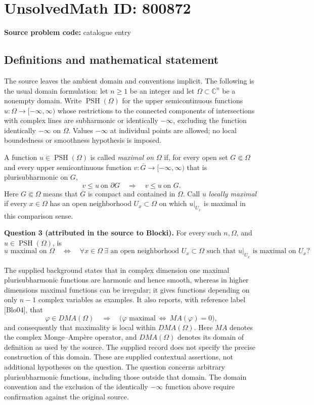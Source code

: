 \documentclass[11pt]{article}
\newcommand{\C}{\mathbb{C}}
\begin{document}
\section*{UnsolvedMath ID: 800872}
\textbf{Source problem code:} catalogue entry
\subsection{Definitions and mathematical statement}
The source leaves the ambient domain and conventions implicit. The following is the usual domain formulation: let \(n\geq 1\) be an integer and let \(\Omega\subset\C^n\) be a nonempty domain. Write \(\operatorname{PSH}(\Omega)\) for the upper semicontinuous functions \(u:\Omega\to[-\infty,\infty)\) whose restrictions to the connected components of intersections with complex lines are subharmonic or identically \(-\infty\), excluding the function identically \(-\infty\) on \(\Omega\). Values \(-\infty\) at individual points are allowed; no local boundedness or smoothness hypothesis is imposed.

A function \(u\in\operatorname{PSH}(\Omega)\) is called \emph{maximal on \(\Omega\)} if, for every open set \(G\Subset\Omega\) and every upper semicontinuous function \(v:\overline G\to[-\infty,\infty)\) that is plurisubharmonic on \(G\),
\[
 v\leq u\ \text{on }\partial G
 \quad\Longrightarrow\quad
 v\leq u\ \text{on }G.
\]
Here \(G\Subset\Omega\) means that \(\overline G\) is compact and contained in \(\Omega\). Call \(u\) \emph{locally maximal} if every \(x\in\Omega\) has an open neighborhood \(U_x\subset\Omega\) on which \(u|_{U_x}\) is maximal in this comparison sense.

\textbf{Question 3 (attributed in the source to Blocki).} For every such \(n,\Omega\), and \(u\in\operatorname{PSH}(\Omega)\), is
\[
 u\text{ maximal on }\Omega
 \quad\Longleftrightarrow\quad
 \forall x\in\Omega\ \exists\text{ an open neighborhood }U_x\subset\Omega
 \text{ such that }u|_{U_x}\text{ is maximal on }U_x?
\]

The supplied background states that in complex dimension one maximal plurisubharmonic functions are harmonic and hence smooth, whereas in higher dimensions maximal functions can be irregular; it gives functions depending on only \(n-1\) complex variables as examples. It also reports, with reference label [Blo04], that
\[
 \varphi\in DMA(\Omega)
 \quad\Longrightarrow\quad
 \bigl(\varphi\text{ maximal}\ \Longleftrightarrow\ MA(\varphi)=0\bigr),
\]
and consequently that maximality is local within \(DMA(\Omega)\). Here \(MA\) denotes the complex Monge--Amp\`ere operator, and \(DMA(\Omega)\) denotes its domain of definition as used by the source. The supplied record does not specify the precise construction of this domain. These are supplied contextual assertions, not additional hypotheses on the question. The question concerns arbitrary plurisubharmonic functions, including those outside that domain. The domain convention and the exclusion of the identically \(-\infty\) function above require confirmation against the original source.
\end{document}

